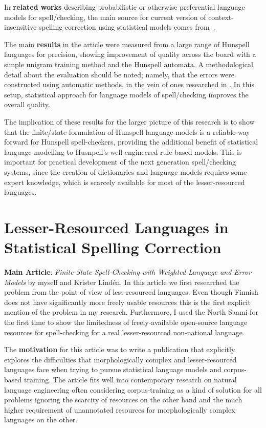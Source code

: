 \documentclass[officiallayout]{unihelcompling}
\begin{document}
In \textbf{related works} describing probabilistic or otherwise preferential
language models for spell\-/checking, the main source for current version of 
context-insensitive spelling correction using statistical models comes
from~\citet{church1991probability}.

The main \textbf{results} in the article were measured from a large range of
Hunspell languages for precision, showing improvement of quality across the
board with a simple unigram training method and the Hunspell automata. A
methodological detail about the evaluation should be noted; namely, that the errors were
constructed using automatic methods, in the vein of ones researched in
\citep{bigert2003autoeval,bigert2005automatic}. In this setup, statistical approach for language models of spell\-/checking improves
the overall quality.

The implication of these results for the larger picture of this research is to
show that the finite\-/state formulation of Hunspell language models is a
reliable way forward for Hunspell spell-checkers, providing the additional
benefit of statistical language modelling to Husnpell's well-engineered
rule-based models. This is important for practical development of the next
generation spell\-/checking systems, since the creation of dictionaries and
language models requires some expert knowledge, which is scarcely available for
most of the lesser-resourced languages.

\section{Lesser-Resourced Languages in Statistical Spelling Correction}
\label{sec:lesser-training}

\textbf{Main Article}: \emph{Finite-State Spell-Checking with Weighted Language
and Error Models} by myself and Krister Lindén. In this article we first
researched the problem from the point of view of less-resourced languages. Even
though Finnish does not have significantly more freely usable resources this is
the first explicit mention of the problem in my research. Furthermore, I used
the North Saami for the first time to show the limitedness of freely-available
open-source language resources for spell-checking for a real lesser-resourced
non-national language.

The \textbf{motivation} for this article was to write a publication that
explicitly explores the difficulties that morphologically complex and
lesser-resourced languages face when trying to pursue statistical language
models and corpus-based training. The article fits well into contemporary
research on natural language engineering often considering corpus-training as a
kind of solution for all problems ignoring the scarcity of resources on the
other hand and the much higher requirement of unannotated resources for
morphologically complex languages on the other.
\end{document}
